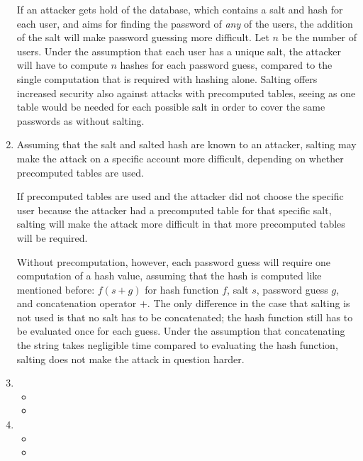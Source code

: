 \begin{enumerate}
If an attacker gets hold of the database, which contains a salt and hash for each user, and aims for finding the password of \emph{any} of the users, the addition of the salt will make password guessing more difficult. Let $n$ be the number of users. Under the assumption that each user has a unique salt, the attacker will have to compute $n$ hashes for each password guess, compared to the single computation that is required with hashing alone. Salting offers increased security also against attacks with precomputed tables, seeing as one table would be needed for each possible salt in order to cover the same passwords as without salting.
\item %
Assuming that the salt and salted hash are known to an attacker, salting may make the attack on a specific account more difficult, depending on whether precomputed tables are used.

If precomputed tables are used and the attacker did not choose the specific user because the attacker had a precomputed table for that specific salt, salting will make the attack more difficult in that more precomputed tables will be required.

Without precomputation, however, each password guess will require one computation of a hash value, assuming that the hash is computed like mentioned before: $f(s + g)$ for hash function $f$, salt $s$, password guess $g$, and concatenation operator $+$. The only difference in the case that salting is not used is that no salt has to be concatenated; the hash function still has to be evaluated once for each guess. Under the assumption that concatenating the string takes negligible time compared to evaluating the hash function, salting does not make the attack in question harder.
\item \highergradesonly
  \begin{itemize}
    \item
    \item
  \end{itemize}
\item
  \begin{itemize}
    \item 
    \item
  \end{itemize}
\end{enumerate}
